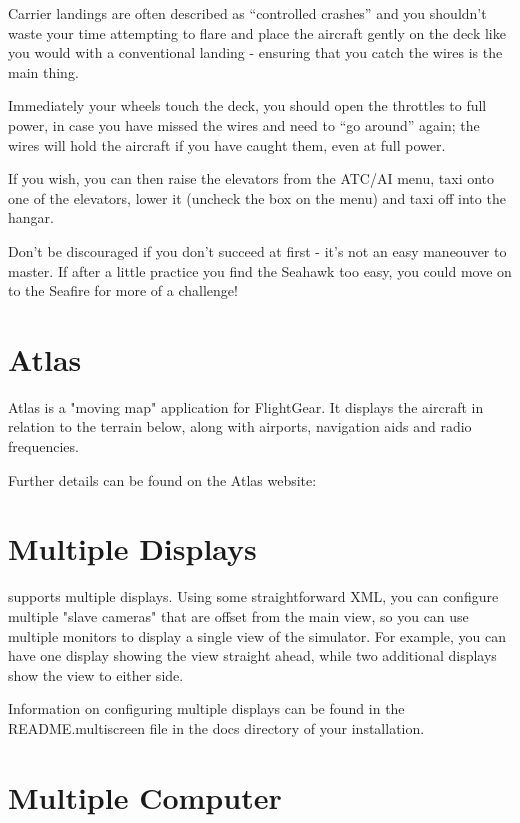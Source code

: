 \begin{enumerate}
Carrier landings are often described as ``controlled crashes'' and you shouldn't waste your time attempting
to flare and place the aircraft gently on the deck like you would with a conventional landing - ensuring that
you catch the wires is the main thing.

Immediately your wheels touch the deck, you should open the throttles to full power, in case you have
missed the wires and need to ``go around'' again; the wires will hold the aircraft if you have caught them,
even at full power.

If you wish, you can then raise the elevators from the ATC/AI menu, taxi onto one of the elevators,
lower it (uncheck the box on the menu) and taxi off into the hangar.

Don't be discouraged if you don't succeed at first - it's not an easy maneouver to master. If after a little
practice you find the Seahawk too easy, you could move on to the Seafire for more of a challenge!


\section{Atlas\label{Atlas}}

Atlas is a "moving map" application for FlightGear. It displays the aircraft in relation to the terrain below,
along with airports, navigation aids and radio frequencies.

Further details can be found on the Atlas website:

\noindent
{}

\section{Multiple Displays}

\FlightGear{} supports multiple displays. Using some straightforward
 XML, you can configure multiple "slave cameras" that are offset from
the main view, so you can use multiple monitors to display a
single view of the simulator. For example, you can have one display
showing the view straight ahead, while two additional displays show
the view to either side.

Information on configuring multiple displays can be found in the
README.multiscreen file in the docs directory of your \FlightGear{}
installation.

\section{Multiple Computer}


\end{enumerate}
